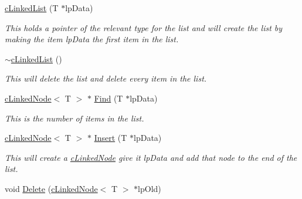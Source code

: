 \begin{DoxyCompactItemize}
\item 
\hypertarget{classc_linked_list_adbdde7829ddb9dc0518126d8e0164e10}{
\hyperlink{classc_linked_list_adbdde7829ddb9dc0518126d8e0164e10}{cLinkedList} (T $\ast$lpData)}
\label{classc_linked_list_adbdde7829ddb9dc0518126d8e0164e10}

\begin{DoxyCompactList}\small\item\em This holds a pointer of the relevant type for the list and will create the list by making the item lpData the first item in the list. \end{DoxyCompactList}\item 
\hypertarget{classc_linked_list_a80aef75883bffae5da5ee7d8b9258502}{
\hyperlink{classc_linked_list_a80aef75883bffae5da5ee7d8b9258502}{$\sim$cLinkedList} ()}
\label{classc_linked_list_a80aef75883bffae5da5ee7d8b9258502}

\begin{DoxyCompactList}\small\item\em This will delete the list and delete every item in the list. \end{DoxyCompactList}\item 
\hyperlink{classc_linked_node}{cLinkedNode}$<$ T $>$ $\ast$ \hyperlink{classc_linked_list_a6014141bbd16b32e22b4b7deb873f1ae}{Find} (T $\ast$lpData)
\begin{DoxyCompactList}\small\item\em This is the number of items in the list. \end{DoxyCompactList}\item 
\hypertarget{classc_linked_list_ae9bedf047bccf0f63b10b662c809032c}{
\hyperlink{classc_linked_node}{cLinkedNode}$<$ T $>$ $\ast$ \hyperlink{classc_linked_list_ae9bedf047bccf0f63b10b662c809032c}{Insert} (T $\ast$lpData)}
\label{classc_linked_list_ae9bedf047bccf0f63b10b662c809032c}

\begin{DoxyCompactList}\small\item\em This will create a \hyperlink{classc_linked_node}{cLinkedNode} give it lpData and add that node to the end of the list. \end{DoxyCompactList}\item 
\hypertarget{classc_linked_list_ab4694aa48324f52b8b1c25eb43dc996c}{
void \hyperlink{classc_linked_list_ab4694aa48324f52b8b1c25eb43dc996c}{Delete} (\hyperlink{classc_linked_node}{cLinkedNode}$<$ T $>$ $\ast$lpOld)}
\label{classc_linked_list_ab4694aa48324f52b8b1c25eb43dc996c}


\end{DoxyCompactItemize}
